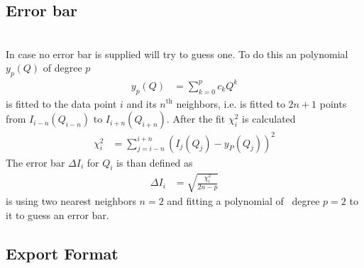 \subsection{Error bar} \hspace{1pt}\\

\noindent
In case no error bar is supplied \SASfit will try to guess one.
To do this an polynomial $y_p(Q)$ of degree $p$
\begin{align}
y_p(Q) &= \sum_{k=0}^p c_k Q^k
\end{align}
is fitted to the data point $i$ and its $n^\textrm{th}$ neighbors,
i.e. is fitted to $2n+1$ points from $I_{i-n}(Q_{i-n})$ to $I_{i+n}(Q_{i+n})$.
After the fit $\chi_i^2$ is calculated
\begin{align}
\chi_i^2&=\sum_{j=i-n}^{i+n} \left(I_j(Q_j)-y_P(Q_j)\right)^2
\end{align}
The error bar $\Delta I_i$ for $Q_i$ is than defined as
\begin{align}
\Delta I_i &= \sqrt{\frac{\chi_i^2}{2n-p}}
\end{align}
\SASfit is using two nearest neighbors $n=2$ and fitting a polynomial of \
degree $p=2$ to it to guess an error bar.

\vspace{1cm}

\subsection{Export Format} \hspace{1pt}\\

